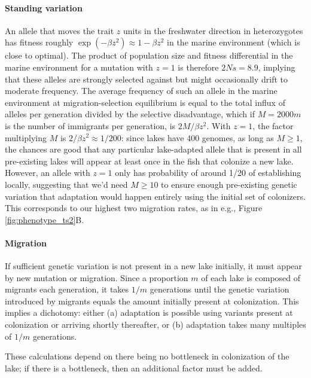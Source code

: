 \documentclass{article}
\begin{document}
\paragraph{Standing variation}
An allele that moves the trait $z$ units in the freshwater direction in heterozygotes
has fitness roughly $\exp(-\beta z^2) \approx 1 - \beta z^2$ in the marine environment
(which is close to optimal).
The product of population size and fitness differential in the marine environment
for a mutation with $z=1$
is therefore $2Ns = 8.9$, implying that these alleles are strongly selected against
but might occasionally drift to moderate frequency.
The average frequency of such an allele in the marine environment at migration-selection equilibrium
is equal to the total influx of alleles per generation divided by the selective disadvantage,
which if $M = 2000 m$ is the number of immigrants per generation,
is $2 M / \beta z^2$. 
With $z=1$, the factor multiplying $M$ is $2/\beta z^2 \approx 1/200$:
since lakes have 400 genomes, 
as long as $M \ge 1$, the chances are good that any particular lake-adapted allele
that is present in all pre-existing lakes
will appear at least once in the fish that colonize a new lake.
However, an allele with $z=1$ only has probability of around 1/20 of establishing locally,
suggesting that we'd need $M \ge 10$ to ensure enough pre-existing genetic variation
that adaptation would happen entirely using the initial set of colonizers.
This corresponds to our highest two migration rates,
as in e.g., Figure \ref{fig:phenotype_ts2}B.

\paragraph{Migration}
If sufficient genetic variation is not present in a new lake initially,
it must appear by new mutation or migration.
Since a proportion $m$ of each lake is composed of migrants each generation,
it takes $1/m$ generations until the genetic variation introduced by migrants
equals the amount initially present at colonization.
This implies a dichotomy: either 
(a) adaptation is possible using variants present at colonization
or arriving shortly thereafter, or 
(b) adaptation takes many multiples of $1/m$ generations.

These calculations depend on there being no bottleneck in colonization of the lake;
if there is a bottleneck, then an additional factor must be added.
\end{document}
